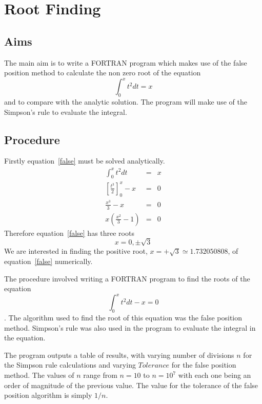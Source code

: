 \documentclass[a4paper]{IEEEtran}
\begin{document}
\section{Root Finding}

\subsection{Aims}

    The main aim is to write a FORTRAN program which makes use of the
    false position method to calculate the non zero root of the 
    equation
    \begin{equation}
        \label{false}
        \int_{0}^{x} t^2 dt = x
    \end{equation}
    and to compare with the analytic solution. The program will make use
    of the Simpson's rule to evaluate the integral.

\subsection*{Procedure}
    Firstly equation~\ref{false} must be solved analytically.
    \begin{eqnarray}
        \int_{0}^{x} t^2 dt         & = & x \nonumber \\
        \left[\frac{t^3}{2}\right]_{0}^{x} - x & = & 0 \nonumber \\
        \frac{x^3}{3} - x & = & 0 \nonumber \\
        x\left(\frac{x^2}{3} - 1\right) & = & 0 \nonumber 
    \end{eqnarray}
    Therefore equation~\ref{false} has three roots
        \[ x = 0, \pm\sqrt{3} \]
    We are interested in finding the positive root,
    $x = +\sqrt{3} \simeq 1.732050808$, of equation~\ref{false} numerically.

    The procedure involved writing a FORTRAN program to find the roots
    of the equation
        \[ \int_{0}^{x} t^2 dt -x = 0 \].
    The algorithm used to find the root of this equation was the false
    position method. Simpson's rule was also used in the program to
    evaluate the integral in the equation.

    The program outputs a table of results, with varying number of
    divisions $n$ for the Simpson rule calculations and varying
    $Tolerance$ for the false position method. The values of $n$ range
    from $n = 10$ to $n = 10^7$ with each one being an order of
    magnitude of the previous value. The value for the tolerance of the
    false position algorithm is simply $1/n$.
\end{document}
